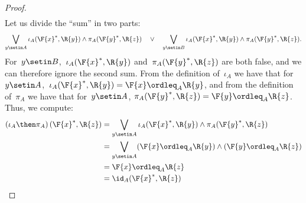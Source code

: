 \begin{proof}
\begin{equation}
\begin{aligned}
        \end{aligned}
    \end{equation}
    Let us divide the ``sum'' in two parts:
    \begin{equation}
        \bigvee_{y \setin A} \iota_A(\F{x}^*,\R{y}) \wedge \pi_A(\F{y}^*,\R{z}) \quad\vee\quad
        \bigvee_{y \setin B} \iota_A(\F{x}^*,\R{y}) \wedge \pi_A(\F{y}^*,\R{z}).
    \end{equation}
    For~$y \setin B$,~$\iota_A(\F{x}^*,\R{y})$ and~$\pi_A(\F{y}^*,\R{z})$ are both false, and we can therefore ignore the second sum.
    From the definition of~$\iota_A$ we have that for~$y\setin A$,~$ \iota_A(\F{x}^*,\R{y})=\F{x} \ordleq_A \R{y}$, and from the definition of~$\pi_A$ we have that for~$y\setin A$, $\pi_A(\F{y}^*,\R{z})=\F{y} \ordleq_A \R{z}$.
    Thus, we compute:
    \begin{equation}
        \begin{aligned}
            \left(\iota_A\then \pi_A\right)(\F{x}^*, \R{z}) & = \bigvee_{y \setin A} \iota_A(\F{x}^*,\R{y}) \wedge \pi_A(\F{y}^*,\R{z}) \\
                                                            & = \bigvee_{y \setin A} (\F{x} \ordleq_A \R{y}) \wedge  (\F{y} \ordleq_A \R{z}) \\
                                                            & = \F{x} \ordleq_A \R{z} \\
                                                            & = \id_A(\F{x}^*, \R{z})
        \end{aligned}
    \end{equation}
\end{proof}

